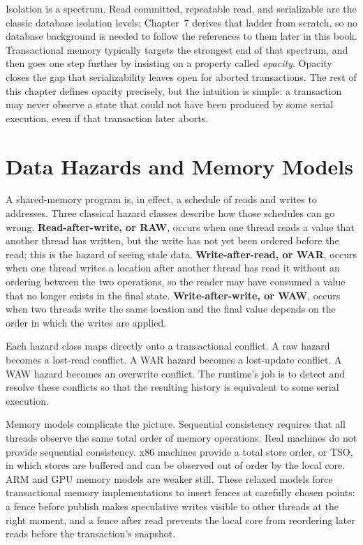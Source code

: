 Isolation is a spectrum. Read committed, repeatable read, and serializable are
the classic database isolation levels; Chapter~7 derives that ladder from
scratch, so no database background is needed to follow the references to them
later in this book.
Transactional memory typically targets the
strongest end of that spectrum, and then goes one step further by insisting on
a property called \emph{opacity}. Opacity closes the gap that serializability
leaves open for aborted transactions. The rest of this chapter defines opacity
precisely, but the intuition is simple: a transaction may never observe a state
that could not have been produced by some serial execution, even if that
transaction later aborts.

\section{Data Hazards and Memory Models}

A shared-memory program is, in effect, a schedule of reads and writes to
addresses. Three classical hazard classes describe how those schedules can go
wrong. \textbf{Read-after-write, or RAW}, occurs when one thread reads a value
that another thread has written, but the write has not yet been ordered before
the read; this is the hazard of seeing stale data. \textbf{Write-after-read,
or WAR}, occurs when one thread writes a location after another thread has
read it without an ordering between the two operations, so the reader may have
consumed a value that no longer exists in the final state.
\textbf{Write-after-write, or WAW}, occurs when two threads write the same
location and the final value depends on the order in which the writes are
applied.

Each hazard class maps directly onto a transactional conflict. A raw hazard
becomes a lost-read conflict. A WAR hazard becomes a lost-update conflict. A
WAW hazard becomes an overwrite conflict. The runtime's job is to detect and
resolve these conflicts so that the resulting history is equivalent to some
serial execution.

Memory models complicate the picture. Sequential consistency requires that all
threads observe the same total order of memory operations. Real machines do not
provide sequential consistency. x86 machines provide a total store order, or
TSO, in which stores are buffered and can be observed out of order by the local
core. ARM and GPU memory models are weaker still. These relaxed models force
transactional memory implementations to insert fences at carefully chosen
points: a fence before publish makes speculative writes visible to other
threads at the right moment, and a fence after read prevents the local core
from reordering later reads before the transaction's snapshot.

